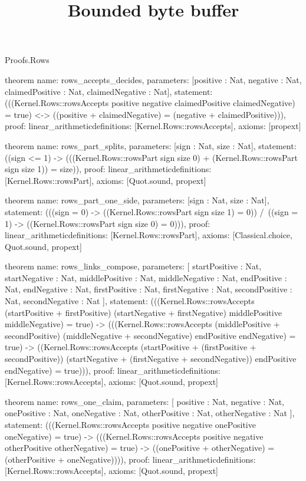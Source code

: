 \begin{lexlean}{Proofs.Rows}
\title{Bounded byte buffer}
\begin{semanticmodule}
theorem{
  name: rows_accepts_decides,
  parameters: [positive : Nat, negative : Nat, claimedPositive : Nat, claimedNegative : Nat],
  statement: (((Kernel.Rows::rowsAccepts positive negative claimedPositive claimedNegative) = true) <-> ((positive + claimedNegative) = (negative + claimedPositive))),
  proof: linear_arithmetic{definitions: [Kernel.Rows::rowsAccepts]},
  axioms: [propext]
}

theorem{
  name: rows_part_splits,
  parameters: [sign : Nat, size : Nat],
  statement: ((sign <= 1) -> (((Kernel.Rows::rowsPart sign size 0) + (Kernel.Rows::rowsPart sign size 1)) = size)),
  proof: linear_arithmetic{definitions: [Kernel.Rows::rowsPart]},
  axioms: [Quot.sound, propext]
}

theorem{
  name: rows_part_one_side,
  parameters: [sign : Nat, size : Nat],
  statement: (((sign = 0) -> ((Kernel.Rows::rowsPart sign size 1) = 0)) /\ ((sign = 1) -> ((Kernel.Rows::rowsPart sign size 0) = 0))),
  proof: linear_arithmetic{definitions: [Kernel.Rows::rowsPart]},
  axioms: [Classical.choice, Quot.sound, propext]
}

theorem{
  name: rows_links_compose,
  parameters: [
    startPositive : Nat,
    startNegative : Nat,
    middlePositive : Nat,
    middleNegative : Nat,
    endPositive : Nat,
    endNegative : Nat,
    firstPositive : Nat,
    firstNegative : Nat,
    secondPositive : Nat,
    secondNegative : Nat
  ],
  statement: (((Kernel.Rows::rowsAccepts (startPositive + firstPositive) (startNegative + firstNegative) middlePositive middleNegative) = true) -> (((Kernel.Rows::rowsAccepts (middlePositive + secondPositive) (middleNegative + secondNegative) endPositive endNegative) = true) -> ((Kernel.Rows::rowsAccepts (startPositive + (firstPositive + secondPositive)) (startNegative + (firstNegative + secondNegative)) endPositive endNegative) = true))),
  proof: linear_arithmetic{definitions: [Kernel.Rows::rowsAccepts]},
  axioms: [Quot.sound, propext]
}

theorem{
  name: rows_one_claim,
  parameters: [
    positive : Nat,
    negative : Nat,
    onePositive : Nat,
    oneNegative : Nat,
    otherPositive : Nat,
    otherNegative : Nat
  ],
  statement: (((Kernel.Rows::rowsAccepts positive negative onePositive oneNegative) = true) -> (((Kernel.Rows::rowsAccepts positive negative otherPositive otherNegative) = true) -> ((onePositive + otherNegative) = (otherPositive + oneNegative)))),
  proof: linear_arithmetic{definitions: [Kernel.Rows::rowsAccepts]},
  axioms: [Quot.sound, propext]
}


\end{semanticmodule}
\end{lexlean}
